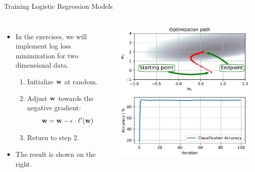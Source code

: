 \documentclass[10pt, aspectratio=169]{beamer} %
\newcommand{\w}{{\bf w}}
\begin{document}
\begin{frame}[fragile]{Training Logistic Regression Models}
\begin{columns}
\begin{itemize}
	\item In the exercises, we will implement log loss minimization for two dimensional data.
	\begin{enumerate}
		\item Initialize $\w$ at random.
		\item Adjust $\w$ towards the negative gradient:
		\[
		\w = \w - \epsilon \cdot \ell'(\w)
		\]
		\item Return to step 2.
	\end{enumerate}
	\item The result is shown on the right.
\end{itemize}
\includegraphics[width=\textwidth]{log_loss_minimization}
\end{columns}
\end{frame}
\end{document}
